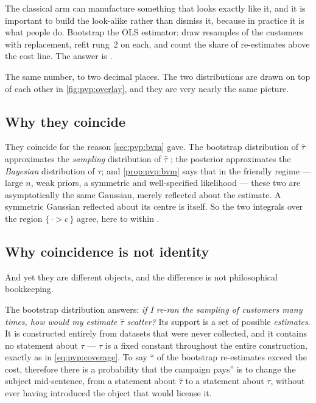 The classical arm can manufacture something that looks exactly like it, and it is important to
build the look-alike rather than dismiss it, because in practice it is what people do. Bootstrap
the OLS estimator: draw \nbZeroNBoot{} resamples of the \nbZeroNCustomers{} customers with
replacement, refit rung~2 on each, and count the share of re-estimates above the cost line. The
answer is \nbZeroBootShare.

The same number, to two decimal places. The two distributions are drawn on top of each other in
\cref{fig:pvp:overlay}, and they are very nearly the same picture.



\subsection*{Why they coincide}

They coincide for the reason \cref{sec:pvp:bvm} gave. The bootstrap distribution of $\hat\tau$
approximates the \emph{sampling} distribution of $\hat\tau$ \citep{efron1979}; the posterior
approximates the \emph{Bayesian} distribution of $\tau$; and \cref{prop:pvp:bvm} says that in the
friendly regime --- large $n$, weak priors, a symmetric and well-specified likelihood --- these
two are asymptotically the same Gaussian, merely reflected about the estimate. A symmetric
Gaussian reflected about its centre is itself. So the two integrals over the region $\{\,\cdot >
c\,\}$ agree, here to within \nbZeroBootGap.

\subsection*{Why coincidence is not identity}

And yet they are different objects, and the difference is not philosophical bookkeeping.

The bootstrap distribution answers: \emph{if I re-ran the sampling of customers many times, how
would my estimate $\hat\tau$ scatter?} Its support is a set of possible \emph{estimates}. It is
constructed entirely from datasets that were never collected, and it contains no statement about
$\tau$ --- $\tau$ is a fixed constant throughout the entire construction, exactly as in
\cref{eq:pvp:coverage}. To say ``\nbZeroBootShare{} of the bootstrap re-estimates exceed the cost,
therefore there is a \nbZeroBootShare{} probability that the campaign pays'' is to change the
subject mid-sentence, from a statement about $\hat\tau$ to a statement about $\tau$, without ever
having introduced the object that would license it.

